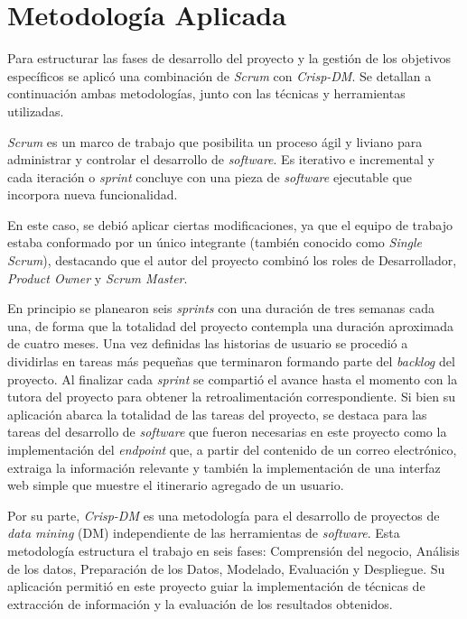 \FloatBarrier{}
\section{Metodología Aplicada}%
\label{sec:methodology}

Para estructurar las fases de desarrollo del proyecto y la gestión de los objetivos específicos se aplicó una
combinación de \textit{Scrum} con \textit{Crisp-DM}.
Se detallan a continuación ambas metodologías, junto con las técnicas y herramientas utilizadas.

\textit{Scrum} es un marco de trabajo que posibilita un proceso ágil y liviano para administrar y controlar el
desarrollo de \textit{software}.
Es iterativo e incremental y cada iteración o \textit{sprint} concluye con una pieza de \textit{software} ejecutable que
incorpora nueva funcionalidad.

En este caso, se debió aplicar ciertas modificaciones, ya que el equipo de trabajo estaba conformado por un único
integrante (también conocido como \textit{Single Scrum}), destacando que el autor del proyecto combinó los roles de
Desarrollador, \textit{Product Owner} y \textit{Scrum Master}.

En principio se planearon seis \textit{sprints} con una duración de tres semanas cada una, de forma que la totalidad del
proyecto contempla una duración aproximada de cuatro meses.
Una vez definidas las historias de usuario se procedió a dividirlas en tareas más pequeñas que terminaron
formando parte del \textit{backlog} del proyecto.
Al finalizar cada \textit{sprint} se compartió el avance hasta el momento con la tutora del proyecto para obtener
la retroalimentación correspondiente.
Si bien su aplicación abarca la totalidad de las tareas del proyecto, se destaca para las tareas del
desarrollo de \textit{software} que fueron necesarias en este proyecto como la implementación del \textit{endpoint} que,
a partir del contenido de un correo electrónico, extraiga la información relevante y también la implementación de una
interfaz web simple que muestre el itinerario agregado de un usuario.

Por su parte, \textit{Crisp-DM} es una metodología para el desarrollo de proyectos de \textit{data mining} (DM)
independiente de las herramientas de \textit{software}.
Esta metodología estructura el trabajo en seis fases: Comprensión del negocio, Análisis de los datos, Preparación de los
Datos, Modelado, Evaluación y Despliegue.
Su aplicación permitió en este proyecto guiar la implementación de técnicas de extracción de información y la evaluación
de los resultados obtenidos.

